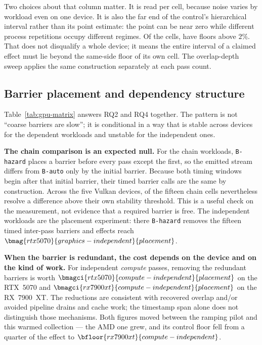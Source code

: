 \documentclass[10pt,twocolumn]{article}
\begin{document}
Two choices about that column matter. It is read per cell, because noise varies
by workload even on one device. It is also the far end of the control's
hierarchical interval rather than its point estimate: the point can be near
zero while different process repetitions occupy different regimes. Of the
 cells,  have floors above $2\%$.
That does not disqualify a whole device; it means the entire interval of a
claimed effect must lie beyond the same-side floor of its own cell.
The overlap-depth sweep applies the same construction separately at each pass
count.

\subsection{Barrier placement and dependency structure}
\label{sec:placement}




Table~\ref{tab:gpu-matrix} answers RQ2 and RQ4 together. The pattern is not
``coarse barriers are slow''; it is conditional in a way that is stable across
devices for the dependent workloads and unstable for the independent ones.

\textbf{The chain comparison is an expected null.} For the chain workloads,
\texttt{B-hazard} places a barrier before every pass except the first, so the
emitted stream differs from \texttt{B-auto} only by the initial barrier.
Because both timing windows begin after that initial barrier, their timed
barrier calls are the same by construction. Across the five Vulkan devices,
 of the fifteen chain cells nevertheless resolve a
difference above their own stability threshold. This is a useful check on the
measurement, not evidence that a required barrier is free. The independent
workloads are the placement experiment: there \texttt{B-hazard} removes the
fifteen timed inter-pass barriers and effects reach
$\bmag{rtx5070}{graphics-independent}{placement}$.

\textbf{When the barrier is redundant, the cost depends on the device and on
the kind of work.} For independent \emph{compute} passes, removing the
redundant barriers is worth $\bmagci{rtx5070}{compute-independent}{placement}$
on the RTX~5070 and $\bmagci{rx7900xt}{compute-independent}{placement}$ on the
RX~7900~XT. The reductions are consistent with recovered overlap and/or avoided
pipeline drains and cache work; the timestamp span alone does not distinguish
those mechanisms. Both figures moved between the ramping pilot
and this warmed collection --- the AMD one grew, and its control floor fell
from a quarter of the effect to $\bfloor{rx7900xt}{compute-independent}$.
\end{document}
